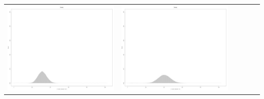 \begin{table}[htbp]
{\begin{tabular}{l | ccccc}
\begin{minipage}{.15\textwidth}
     			 	\includegraphics[width=\linewidth]{images/mema-dens-graph/N12}
    				 \end{minipage}
    			   &	 \begin{minipage}{.15\textwidth}\vspace{2pt}     							
     			 	\includegraphics[width=\linewidth]{images/mema-dens-graph/N14}
    				 \end{minipage}
    			   &	 \begin{minipage}{.15\textwidth}\vspace{2pt}     							

\end{minipage}
\end{tabular}}
\end{table}
